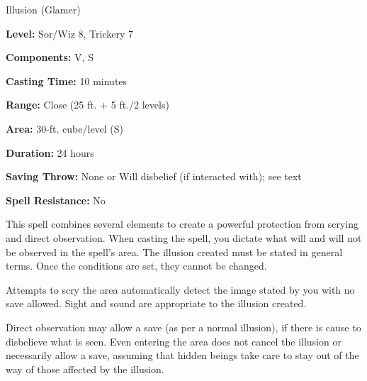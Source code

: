 
Illusion (Glamer)

\textbf{Level:} Sor/Wiz 8, Trickery 7

\textbf{Components:} V, S

\textbf{Casting Time:} 10 minutes

\textbf{Range:} Close (25 ft. + 5 ft./2 levels)

\textbf{Area:} 30-ft. cube/level (S)

\textbf{Duration:} 24 hours

\textbf{Saving Throw:} None or Will disbelief (if interacted with); see text

\textbf{Spell Resistance:} No

This spell combines several elements to create a powerful protection from scrying 
and direct observation. When casting the spell, you dictate what will and will 
not be observed in the spell's area. The illusion created must be stated in general 
terms. Once the conditions are set, they cannot be changed.

Attempts to scry the area automatically detect the image stated by you with no 
save allowed. Sight and sound are appropriate to the illusion created. 

Direct observation may allow a save (as per a normal illusion), if there is cause 
to disbelieve what is seen. Even entering the area does not cancel the illusion 
or necessarily allow a save, assuming that hidden beings take care to stay out 
of the way of those affected by the illusion.

